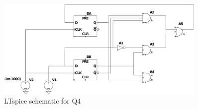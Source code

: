 \begin{figure}[!ht]
\centering
\includegraphics[width=0.9\textwidth]{inc/Q/Q4/Q4.pdf}
\caption{LTspice schematic for Q4}\label{fig:Q4}
\end{figure}\FloatBarrier 

